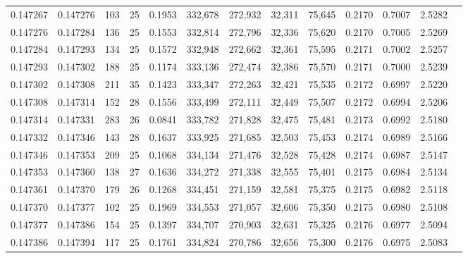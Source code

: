 \begin{tabular}{rrrrrrrrrrrrr}
0.147267 & 0.147276 & 103 &  25 &                                     0.1953 & 332,678 & 272,932 &  32,311 &  75,645 & 0.2170 & 0.7007 & 2.5282 \\
0.147276 & 0.147284 & 136 &  25 &                                     0.1553 & 332,814 & 272,796 &  32,336 &  75,620 & 0.2170 & 0.7005 & 2.5269 \\
0.147284 & 0.147293 & 134 &  25 &                                     0.1572 & 332,948 & 272,662 &  32,361 &  75,595 & 0.2171 & 0.7002 & 2.5257 \\
0.147293 & 0.147302 & 188 &  25 &                                     0.1174 & 333,136 & 272,474 &  32,386 &  75,570 & 0.2171 & 0.7000 & 2.5239 \\
0.147302 & 0.147308 & 211 &  35 &                                     0.1423 & 333,347 & 272,263 &  32,421 &  75,535 & 0.2172 & 0.6997 & 2.5220 \\
0.147308 & 0.147314 & 152 &  28 &                                     0.1556 & 333,499 & 272,111 &  32,449 &  75,507 & 0.2172 & 0.6994 & 2.5206 \\
0.147314 & 0.147331 & 283 &  26 &                                     0.0841 & 333,782 & 271,828 &  32,475 &  75,481 & 0.2173 & 0.6992 & 2.5180 \\
0.147332 & 0.147346 & 143 &  28 &                                     0.1637 & 333,925 & 271,685 &  32,503 &  75,453 & 0.2174 & 0.6989 & 2.5166 \\
0.147346 & 0.147353 & 209 &  25 &                                     0.1068 & 334,134 & 271,476 &  32,528 &  75,428 & 0.2174 & 0.6987 & 2.5147 \\
0.147353 & 0.147360 & 138 &  27 &                                     0.1636 & 334,272 & 271,338 &  32,555 &  75,401 & 0.2175 & 0.6984 & 2.5134 \\
0.147361 & 0.147370 & 179 &  26 &                                     0.1268 & 334,451 & 271,159 &  32,581 &  75,375 & 0.2175 & 0.6982 & 2.5118 \\
0.147370 & 0.147377 & 102 &  25 &                                     0.1969 & 334,553 & 271,057 &  32,606 &  75,350 & 0.2175 & 0.6980 & 2.5108 \\
0.147377 & 0.147386 & 154 &  25 &                                     0.1397 & 334,707 & 270,903 &  32,631 &  75,325 & 0.2176 & 0.6977 & 2.5094 \\
0.147386 & 0.147394 & 117 &  25 &                                     0.1761 & 334,824 & 270,786 &  32,656 &  75,300 & 0.2176 & 0.6975 & 2.5083 \\

\end{tabular}
